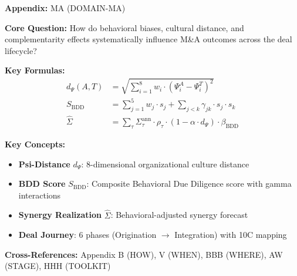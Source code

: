\begin{tcolorbox}[colback=blue!5!white, colframe=blue!75!black,
    title=Quick Reference: Appendix MA]

\textbf{Appendix:} MA (DOMAIN-MA)

\textbf{Core Question:} How do behavioral biases, cultural distance, and complementarity
effects systematically influence M\&A outcomes across the deal lifecycle?

\textbf{Key Formulas:}
\begin{align}
d_\Psi(A,T) &= \sqrt{\sum_{i=1}^{8} w_i \cdot (\Psi_i^A - \Psi_i^T)^2}
    \label{eq:ma-psi-distance} \\
S_{\text{BDD}} &= \sum_{j=1}^{5} w_j \cdot s_j + \sum_{j<k} \gamma_{jk} \cdot s_j \cdot s_k
    \label{eq:ma-bdd-score} \\
\hat{\Sigma} &= \sum_{\tau} \Sigma_\tau^{\text{ann}} \cdot \rho_\tau \cdot (1 - \alpha \cdot d_\Psi) \cdot \beta_{\text{BDD}}
    \label{eq:ma-synergy}
\end{align}

\textbf{Key Concepts:}
\begin{itemize}[nosep]
\item \textbf{Psi-Distance} $d_\Psi$: 8-dimensional organizational culture distance
\item \textbf{BDD Score} $S_{\text{BDD}}$: Composite Behavioral Due Diligence score with gamma interactions
\item \textbf{Synergy Realization} $\hat{\Sigma}$: Behavioral-adjusted synergy forecast
\item \textbf{Deal Journey}: 6 phases (Origination $\to$ Integration) with 10C mapping
\end{itemize}

\textbf{Cross-References:} Appendix B (HOW), V (WHEN), BBB (WHERE), AW (STAGE), HHH (TOOLKIT)
\end{tcolorbox}

\begin{abstract}
This appendix formalizes the application of the Evidence-Based Framework (EBF) to
mergers and acquisitions. We develop the M\&A Behavioral Deal Journey Model (MOD-MA-001),
which maps behavioral biases and cultural dynamics across 6 deal phases using 10C
dimensions. The core contribution is threefold: (1) an 8-dimensional Psi-distance
metric for organizational culture fit, (2) a 5-module Behavioral Due Diligence (BDD)
scoring system with inter-module complementarity, and (3) a behavioral synergy
realization forecast. A smoke test using an ALPLA-like SE Asia acquisition scenario
validates the model (CAS-943).
\end{abstract}


